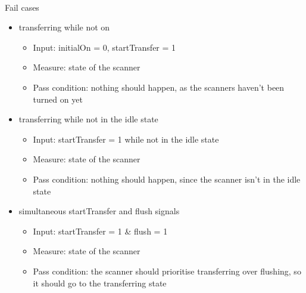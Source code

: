 \documentclass{article}
\begin{document}
  \paragraph{} Fail cases
  \begin{itemize}
    \item transferring while not on
    \begin{itemize}
      \item Input: initialOn = 0, startTransfer = 1
      \item Measure: state of the scanner
      \item Pass condition: nothing should happen, as the scanners haven’t been turned on yet
    \end{itemize}

    \item transferring while not in the idle state
    \begin{itemize}
      \item Input: startTransfer = 1 while not in the idle state
      \item Measure: state of the scanner
      \item Pass condition: nothing should happen, since the scanner isn’t in the idle state
    \end{itemize}

    \item simultaneous startTransfer and flush signals
    \begin{itemize}
      \item Input: startTransfer = 1 \& flush = 1
      \item Measure: state of the scanner
      \item Pass condition: the scanner should prioritise transferring over flushing, so it should go to the transferring state
    \end{itemize}
  \end{itemize}
\end{document}
